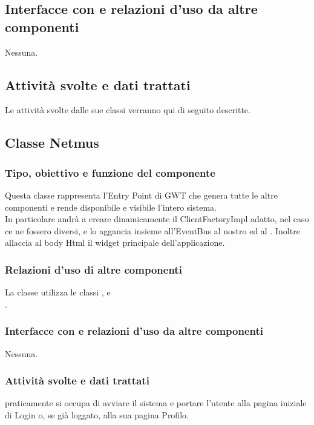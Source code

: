\subsection*{Interfacce con e relazioni d'uso da altre componenti}
Nessuna.

\subsection*{Attivit\`a svolte e dati trattati}
Le attivit\`a svolte dalle sue classi verranno qui di seguito descritte.

\subsection{Classe Netmus}
\subsubsection*{Tipo, obiettivo e funzione del componente}
Questa classe rappresenta l'Entry Point di GWT che genera tutte le altre
componenti e rende disponibile e visibile l'intero sistema.\\
In particolare andr\`a a creare dinamicamente il ClientFactoryImpl adatto, nel
caso ce ne fossero diversi, e lo aggancia insieme all'EventBus al nostro
 ed al .
Inoltre allaccia al body Html il widget principale dell'applicazione.

\subsubsection*{Relazioni d'uso di altre componenti}
La classe  utilizza le classi ,
 e \\.

\subsubsection*{Interfacce con e relazioni d'uso da altre componenti}
Nessuna.

\subsubsection*{Attivit\`a svolte e dati trattati}
 praticamente si occupa di avviare il sistema e portare l'utente alla
pagina iniziale di Login o, se gi\`a loggato, alla sua pagina Profilo.

